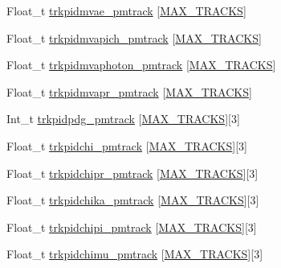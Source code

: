 \begin{DoxyCompactItemize}
\item 
Float\-\_\-t \hyperlink{classanatree_abe142c54cea5aa72c64f9d0009427bf9}{trkpidmvae\-\_\-pmtrack} \mbox{[}\hyperlink{anatree__core__v09410002__orig_8h_a327fd4e796e4a0d78947524c96e4362e}{M\-A\-X\-\_\-\-T\-R\-A\-C\-K\-S}\mbox{]}
\item 
Float\-\_\-t \hyperlink{classanatree_a19b43d87367d0bf4f363f0189c22840d}{trkpidmvapich\-\_\-pmtrack} \mbox{[}\hyperlink{anatree__core__v09410002__orig_8h_a327fd4e796e4a0d78947524c96e4362e}{M\-A\-X\-\_\-\-T\-R\-A\-C\-K\-S}\mbox{]}
\item 
Float\-\_\-t \hyperlink{classanatree_a974e98b742c376ccfe2a3e0bd20947ba}{trkpidmvaphoton\-\_\-pmtrack} \mbox{[}\hyperlink{anatree__core__v09410002__orig_8h_a327fd4e796e4a0d78947524c96e4362e}{M\-A\-X\-\_\-\-T\-R\-A\-C\-K\-S}\mbox{]}
\item 
Float\-\_\-t \hyperlink{classanatree_a1067b651892b2a233dda3af95404c38d}{trkpidmvapr\-\_\-pmtrack} \mbox{[}\hyperlink{anatree__core__v09410002__orig_8h_a327fd4e796e4a0d78947524c96e4362e}{M\-A\-X\-\_\-\-T\-R\-A\-C\-K\-S}\mbox{]}
\item 
Int\-\_\-t \hyperlink{classanatree_a152ff0b86ebe43db932477e6e8c5c97e}{trkpidpdg\-\_\-pmtrack} \mbox{[}\hyperlink{anatree__core__v09410002__orig_8h_a327fd4e796e4a0d78947524c96e4362e}{M\-A\-X\-\_\-\-T\-R\-A\-C\-K\-S}\mbox{]}\mbox{[}3\mbox{]}
\item 
Float\-\_\-t \hyperlink{classanatree_a04f235e7f567a56b9e4f57e29951f56d}{trkpidchi\-\_\-pmtrack} \mbox{[}\hyperlink{anatree__core__v09410002__orig_8h_a327fd4e796e4a0d78947524c96e4362e}{M\-A\-X\-\_\-\-T\-R\-A\-C\-K\-S}\mbox{]}\mbox{[}3\mbox{]}
\item 
Float\-\_\-t \hyperlink{classanatree_a10afd72e171cb2acdf32f559430cce71}{trkpidchipr\-\_\-pmtrack} \mbox{[}\hyperlink{anatree__core__v09410002__orig_8h_a327fd4e796e4a0d78947524c96e4362e}{M\-A\-X\-\_\-\-T\-R\-A\-C\-K\-S}\mbox{]}\mbox{[}3\mbox{]}
\item 
Float\-\_\-t \hyperlink{classanatree_a7dd6069054219c524b779192e4bfe467}{trkpidchika\-\_\-pmtrack} \mbox{[}\hyperlink{anatree__core__v09410002__orig_8h_a327fd4e796e4a0d78947524c96e4362e}{M\-A\-X\-\_\-\-T\-R\-A\-C\-K\-S}\mbox{]}\mbox{[}3\mbox{]}
\item 
Float\-\_\-t \hyperlink{classanatree_a4836875292cc6bd88013cbfad956e7cf}{trkpidchipi\-\_\-pmtrack} \mbox{[}\hyperlink{anatree__core__v09410002__orig_8h_a327fd4e796e4a0d78947524c96e4362e}{M\-A\-X\-\_\-\-T\-R\-A\-C\-K\-S}\mbox{]}\mbox{[}3\mbox{]}
\item 
Float\-\_\-t \hyperlink{classanatree_a1877c5a4dfb4328d9be64fdca42c0839}{trkpidchimu\-\_\-pmtrack} \mbox{[}\hyperlink{anatree__core__v09410002__orig_8h_a327fd4e796e4a0d78947524c96e4362e}{M\-A\-X\-\_\-\-T\-R\-A\-C\-K\-S}\mbox{]}\mbox{[}3\mbox{]}

\end{DoxyCompactItemize}
